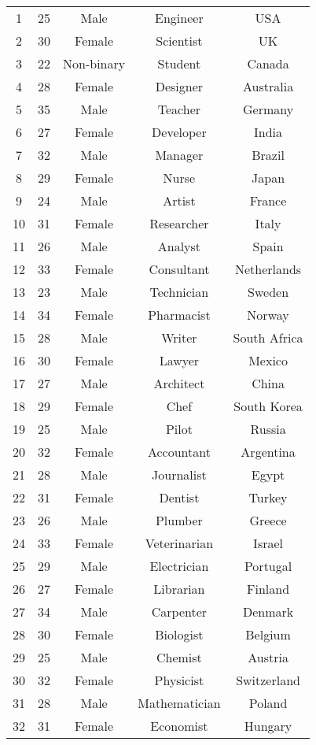 \begin{longtable}{ccccc}
    1 & 25 & Male & Engineer & USA \\
    2 & 30 & Female & Scientist & UK \\
    3 & 22 & Non-binary & Student & Canada \\
    4 & 28 & Female & Designer & Australia \\
    5 & 35 & Male & Teacher & Germany \\
    6 & 27 & Female & Developer & India \\
    7 & 32 & Male & Manager & Brazil \\
    8 & 29 & Female & Nurse & Japan \\
    9 & 24 & Male & Artist & France \\
    10 & 31 & Female & Researcher & Italy \\
    11 & 26 & Male & Analyst & Spain \\
    12 & 33 & Female & Consultant & Netherlands \\
    13 & 23 & Male & Technician & Sweden \\
    14 & 34 & Female & Pharmacist & Norway \\
    15 & 28 & Male & Writer & South Africa \\
    16 & 30 & Female & Lawyer & Mexico \\
    17 & 27 & Male & Architect & China \\
    18 & 29 & Female & Chef & South Korea \\
    19 & 25 & Male & Pilot & Russia \\
    20 & 32 & Female & Accountant & Argentina \\
    21 & 28 & Male & Journalist & Egypt \\
    22 & 31 & Female & Dentist & Turkey \\
    23 & 26 & Male & Plumber & Greece \\
    24 & 33 & Female & Veterinarian & Israel \\
    25 & 29 & Male & Electrician & Portugal \\
    26 & 27 & Female & Librarian & Finland \\
    27 & 34 & Male & Carpenter & Denmark \\
    28 & 30 & Female & Biologist & Belgium \\
    29 & 25 & Male & Chemist & Austria \\
    30 & 32 & Female & Physicist & Switzerland \\
    31 & 28 & Male & Mathematician & Poland \\
    32 & 31 & Female & Economist & Hungary \\

\end{longtable}
